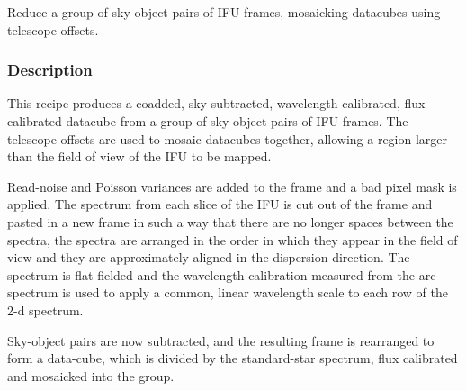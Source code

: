 \documentclass[twoside,11pt]{article}
\renewcommand{\_}{\texttt{\symbol{95}}}
\begin{document}
Reduce a group of sky-object pairs of IFU frames, mosaicking datacubes
using telescope offsets.

\subsubsection*{Description}

This recipe produces a coadded, sky-subtracted, wavelength-calibrated,
flux-calibrated datacube from a group of sky-object pairs of IFU
frames. The telescope offsets are used to mosaic datacubes together,
allowing a region larger than the field of view of the IFU to be
mapped.



Read-noise and Poisson variances are added to the frame and a bad
pixel mask is applied. The spectrum from each slice of the IFU is cut
out of the frame and pasted in a new frame in such a way that there
are no longer spaces between the spectra, the spectra are arranged in
the order in which they appear in the field of view and they are
approximately aligned in the dispersion direction. The spectrum is
flat-fielded and the wavelength calibration measured from the arc
spectrum is used to apply a common, linear wavelength scale to each
row of the 2-d spectrum.



Sky-object pairs are now subtracted, and the resulting frame is
rearranged to form a data-cube, which is divided by the standard-star
spectrum, flux calibrated and mosaicked into the group.
\end{document}
